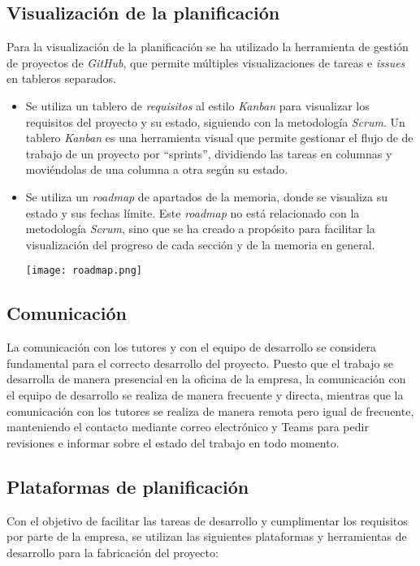 \subsection{Visualización de la planificación}\label{subsec:visual_planif}
Para la visualización de la planificación se ha utilizado la herramienta de gestión de proyectos
de \textit{GitHub}, que permite múltiples visualizaciones de tareas e \textit{issues} en tableros
separados.

\begin{itemize}
	\item Se utiliza un tablero de \textit{requisitos} al estilo \textit{Kanban} para visualizar
		los requisitos del proyecto y su estado, siguiendo con la metodología \textit{Scrum}.
		Un tablero \textit{Kanban} es una herramienta visual que permite gestionar el flujo de
		de trabajo de un proyecto por ``sprints'', dividiendo las tareas en columnas y moviéndolas
		de una columna a otra según su estado.
	\item Se utiliza un \textit{roadmap} de apartados de la memoria, donde se visualiza su estado
		y sus fechas límite. Este \textit{roadmap} no está relacionado con la metodología
		\textit{Scrum}, sino que se ha creado a propósito para facilitar la visualización del
		progreso de cada sección y de la memoria en general.

		\begin{minipage}{\linewidth}
			\centering
			\texttt{[image: roadmap.png]}
		\end{minipage}
\end{itemize}


\subsection{Comunicación}\label{subsec:comunicación}
La comunicación con los tutores y con el equipo de desarrollo se considera fundamental para el
correcto desarrollo del proyecto. Puesto que el trabajo se desarrolla de manera presencial en
la oficina de la empresa, la comunicación con el equipo de desarrollo se realiza de manera
frecuente y directa, mientras que la comunicación con los tutores se realiza de manera remota
pero igual de frecuente, manteniendo el contacto mediante correo electrónico y Teams para
pedir revisiones e informar sobre el estado del trabajo en todo momento.

\subsection{Plataformas de planificación}\label{subsec:plataformas}
Con el objetivo de facilitar las tareas de desarrollo y cumplimentar los requisitos por parte
de la empresa, se utilizan las siguientes plataformas y herramientas de desarrollo para la
fabricación del proyecto:

